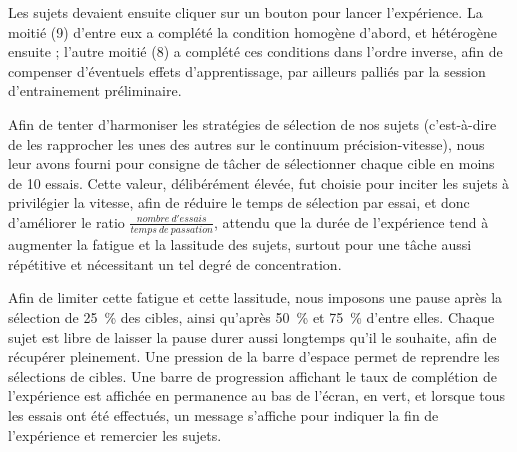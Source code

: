 	
%	
	
	Les sujets devaient ensuite cliquer sur un bouton pour lancer l'expérience. La moitié (9) d'entre eux a complété la condition homogène d'abord, et hétérogène ensuite ; l'autre moitié (8) a complété ces conditions dans l'ordre inverse, afin de compenser d'éventuels effets d'apprentissage, par ailleurs palliés par la session d'entrainement préliminaire.
	
	Afin de tenter d'harmoniser les stratégies de sélection de nos sujets (c'est-à-dire de les rapprocher les unes des autres sur le continuum précision-vitesse), nous leur avons fourni pour consigne de tâcher de sélectionner chaque cible en moins de 10 essais. Cette valeur, délibérément élevée, fut choisie pour inciter les sujets à privilégier la vitesse, afin de réduire le temps de sélection par essai, et donc d'améliorer le ratio $\frac{nombre~d'essais}{temps~de~passation}$, attendu que la durée de l'expérience tend à augmenter la fatigue et la lassitude des sujets, surtout pour une tâche aussi répétitive et nécessitant un tel degré de concentration.
	
	Afin de limiter cette fatigue et cette lassitude, nous imposons une pause après la sélection de 25~\%{} des cibles, ainsi qu'après 50~\%{} et 75~\%{} d'entre elles. Chaque sujet est libre de laisser la pause durer aussi longtemps qu'il le souhaite, afin de récupérer pleinement. Une pression de la barre d'espace permet de reprendre les sélections de cibles. Une barre de progression affichant le taux de complétion de l'expérience est affichée en permanence au bas de l'écran, en vert, et lorsque tous les essais ont été effectués, un message s'affiche pour indiquer la fin de l'expérience et remercier les sujets.
	
